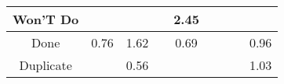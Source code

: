 \begin{tabular}{|c||c|c|c|c|c|c|c|c|}
\hline
Won'T Do &  &  &  & \cellcolor[rgb]{0.7282272072301705,0.7538970981616596,0.42} 2.45 &  &  &  &  \\ 
\hline
Done & \cellcolor[rgb]{0.8647594571166919,0.6258614303523413,0.37777549330891236} 0.76 & \cellcolor[rgb]{0.8321366643952988,0.8031173673451415,0.42} 1.62 &  & \cellcolor[rgb]{0.8513919460141993,0.5625885444672096,0.3652991496132526} 0.69 &  &  &  & \cellcolor[rgb]{0.9032986472513466,0.808280263656374,0.4137454041012568} 0.96 \\ 
\hline
Duplicate &  & \cellcolor[rgb]{0.8285873650948443,0.45464686144892974,0.3440148740885214} 0.56 &  &  &  &  &  & \cellcolor[rgb]{0.9065814025248785,0.8383806643538898,0.42} 1.03 \\ 
\hline
\end{tabular}